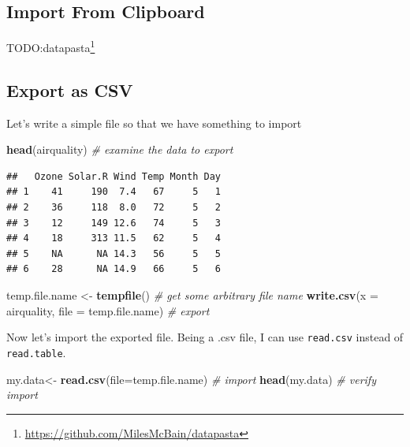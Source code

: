 \documentclass[]{book}
\newenvironment{Shaded}{\begin{snugshade}}{\end{snugshade}}
\newcommand{\CommentTok}[1]{\textcolor[rgb]{0.56,0.35,0.01}{\textit{#1}}}
\newcommand{\DataTypeTok}[1]{\textcolor[rgb]{0.13,0.29,0.53}{#1}}
\newcommand{\KeywordTok}[1]{\textcolor[rgb]{0.13,0.29,0.53}{\textbf{#1}}}
\newcommand{\NormalTok}[1]{#1}
\newcommand{\StringTok}[1]{\textcolor[rgb]{0.31,0.60,0.02}{#1}}
\renewcommand{\href}[2]{#2\footnote{\url{#1}}}
\theoremstyle{definition}
\theoremstyle{definition}
\theoremstyle{definition}
\theoremstyle{remark}
\begin{document}
\hypertarget{import-from-clipboard}{%
\subsection{Import From Clipboard}\label{import-from-clipboard}}

TODO:\href{https://github.com/MilesMcBain/datapasta}{datapasta}

\hypertarget{export-as-csv}{%
\subsection{Export as CSV}\label{export-as-csv}}

Let's write a simple file so that we have something to import

\begin{Shaded}
\begin{Highlighting}[]
\KeywordTok{head}\NormalTok{(airquality) }\CommentTok{#  examine the data to export}
\end{Highlighting}
\end{Shaded}

\begin{verbatim}
##   Ozone Solar.R Wind Temp Month Day
## 1    41     190  7.4   67     5   1
## 2    36     118  8.0   72     5   2
## 3    12     149 12.6   74     5   3
## 4    18     313 11.5   62     5   4
## 5    NA      NA 14.3   56     5   5
## 6    28      NA 14.9   66     5   6
\end{verbatim}

\begin{Shaded}
\begin{Highlighting}[]
\NormalTok{temp.file.name <-}\StringTok{ }\KeywordTok{tempfile}\NormalTok{() }\CommentTok{# get some arbitrary file name}
\KeywordTok{write.csv}\NormalTok{(}\DataTypeTok{x =}\NormalTok{ airquality, }\DataTypeTok{file =}\NormalTok{ temp.file.name) }\CommentTok{# export}
\end{Highlighting}
\end{Shaded}

Now let's import the exported file. Being a .csv file, I can use \texttt{read.csv} instead of \texttt{read.table}.

\begin{Shaded}
\begin{Highlighting}[]
\NormalTok{my.data<-}\StringTok{ }\KeywordTok{read.csv}\NormalTok{(}\DataTypeTok{file=}\NormalTok{temp.file.name) }\CommentTok{# import}
\KeywordTok{head}\NormalTok{(my.data) }\CommentTok{# verify import}
\end{Highlighting}
\end{Shaded}
\end{document}
